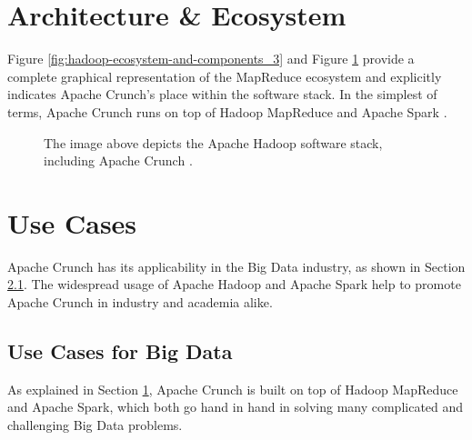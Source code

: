 \documentclass[9pt,twocolumn,twoside]{../../styles/osajnl}
\begin{document}
\section{Architecture \& Ecosystem} \label{ecosystem}
Figure \ref{fig:hadoop-ecosystem-and-components_3} and Figure
\ref{fig:architecture} provide a complete graphical representation of
the MapReduce ecosystem and explicitly indicates Apache Crunch's place
within the software stack. In the simplest of terms, Apache Crunch
runs on top of Hadoop MapReduce and Apache Spark
\cite{www-crunch-api}.
\begin{figure}[htbp]
\centering
{}
\caption{The image above depicts the Apache Hadoop software stack, including Apache Crunch \cite{www-crunch-architecture}.}
\label{fig:architecture}
\end{figure}


\section{Use Cases} \label{use}
Apache Crunch has its applicability in the Big Data industry, as shown
in Section \ref{big}. The widespread usage of Apache Hadoop and Apache
Spark help to promote Apache Crunch in industry and academia alike.

\subsection{Use Cases for Big Data} \label{big}
As explained in Section \ref{ecosystem}, Apache Crunch is built on top
of Hadoop MapReduce and Apache Spark, which both go hand in hand in
solving many complicated and challenging Big Data problems.
\end{document}
